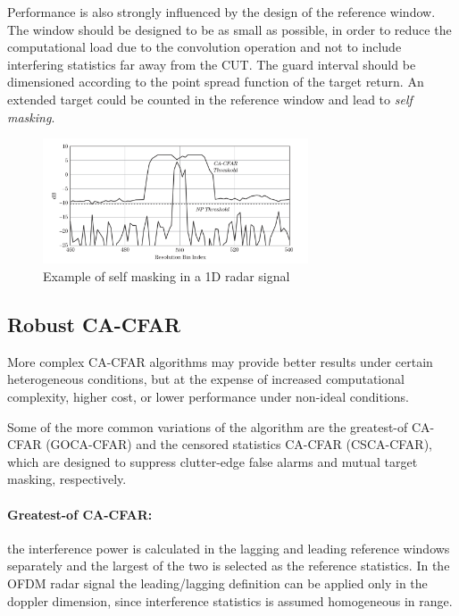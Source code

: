 Performance is also strongly influenced by the design of the reference window. The window should be designed to be as small as possible, in order to reduce the computational load due to the convolution operation and not to include interfering statistics far away from the CUT. The guard interval should be dimensioned according to the point spread function of the target return. An extended target could be counted in the reference window and lead to \textit{self masking}.

\begin{figure}[H]
	\centering
	\includegraphics[width=0.7\textwidth]{Images/radar_detect_threshold/self_masking_Richards2010.png}
	\caption{Example of self masking in a 1D radar signal \cite{Richards_Scheer_Holm_2010}}
	\label{fig:self_masking_Richards2010}
\end{figure}

\subsection{Robust CA-CFAR}
More complex CA-CFAR algorithms may provide better results under certain heterogeneous conditions, but at the expense of increased computational complexity, higher cost, or lower performance under non-ideal conditions.

Some of the more common variations of the algorithm are the greatest-of CA-CFAR (GOCA-CFAR) and the censored statistics CA-CFAR (CSCA-CFAR), which are designed to suppress clutter-edge false alarms and mutual target masking, respectively.

\paragraph{Greatest-of CA-CFAR:}
the interference power is calculated in the lagging and leading reference windows separately and the largest of the two is selected as the reference statistics. In the OFDM radar signal the leading/lagging definition can be applied only in the doppler dimension, since interference statistics is assumed homogeneous in range.

